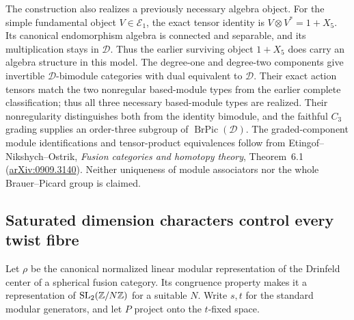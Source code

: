 The construction also realizes a previously necessary algebra object.
For the simple fundamental object $V\in\mathcal E_1$, the exact tensor
identity is $V\otimes V^*=1+X_5$. Its canonical endomorphism algebra
is connected and separable, and its multiplication stays in
$\mathcal D$. Thus the earlier surviving object $1+X_5$ does carry an
algebra structure in this model. The degree-one and degree-two components give invertible
$\mathcal D$-bimodule categories with dual equivalent to $\mathcal D$.
Their exact action tensors match the two nonregular based-module types
from the earlier complete classification; thus all three necessary
based-module types are realized. Their nonregularity distinguishes both
from the identity bimodule, and the faithful $C_3$ grading supplies an
order-three subgroup of $\operatorname{BrPic}(\mathcal D)$. The graded-component module identifications and tensor-product equivalences follow from Etingof--Nikshych--Ostrik, \emph{Fusion categories and homotopy theory}, Theorem~6.1 (\href{https://arxiv.org/abs/0909.3140}{arXiv:0909.3140}). Neither
uniqueness of module associators nor the whole Brauer--Picard group is
claimed.


\subsection{Saturated dimension characters control every twist fibre}
\label{subsec:creative-saturated-conductor}

Let $\rho$ be the canonical normalized linear modular representation of
the Drinfeld center of a spherical fusion category. Its congruence
property makes it a representation of $\mathrm{SL}_2(\mathbb Z/N\mathbb Z)$ for a
suitable $N$. Write $s,t$ for the standard modular generators, and let
$P$ project onto the $t$-fixed space.

